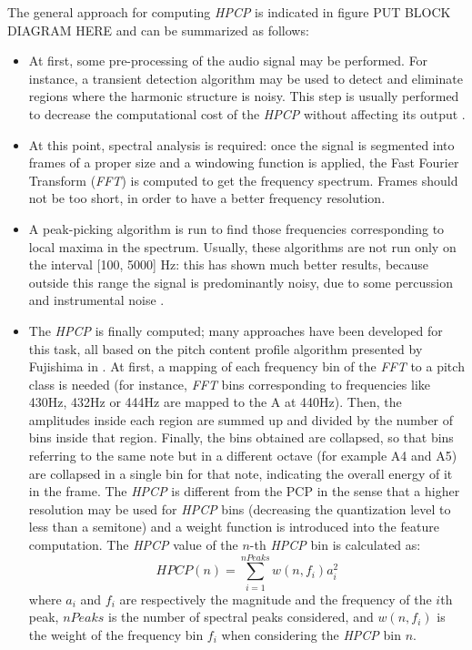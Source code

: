 The general approach for computing \textit{HPCP} is indicated in figure PUT BLOCK DIAGRAM HERE and can be summarized as follows:
\begin{itemize}
\item At first, some pre-processing of the audio signal may be performed. For instance, a transient detection algorithm may be used to detect and eliminate regions where the harmonic structure is noisy. This step is usually performed to decrease the computational cost of the \textit{HPCP} without affecting its output \cite{bonada00}.
\item At this point, spectral analysis is required: once the signal is segmented into frames of a proper size and a windowing function is applied, the Fast Fourier Transform (\textit{FFT}) is computed to get the frequency spectrum. Frames should not be too short, in order to have a better frequency resolution. 
\item A peak-picking algorithm is run to find those frequencies corresponding to local maxima in the spectrum. Usually, these algorithms are not run only on the interval [100, 5000] Hz: this has shown much better results, because outside this range the signal is predominantly noisy, due to some percussion and instrumental noise \cite{gomez06}.
\item The \textit{HPCP} is finally computed; many approaches have been developed for this task, all based on the pitch content profile algorithm presented by Fujishima in \cite{fujishima99}. At first, a mapping of each frequency bin of the \textit{FFT} to a pitch class is needed (for instance, \textit{FFT} bins corresponding to frequencies like 430Hz, 432Hz or 444Hz are mapped to the A at 440Hz). Then, the amplitudes inside each region are summed up and divided by the number of bins inside that region. Finally, the bins obtained are collapsed, so that bins referring to the same note but in a different octave (for example A4 and A5) are collapsed in a single bin for that note, indicating the overall energy of it in the frame. The \textit{HPCP} is different from the PCP in the sense that a higher resolution may be used for \textit{HPCP} bins (decreasing the quantization level to less than a semitone) and a weight function is introduced into the feature computation. The \textit{HPCP} value of the $n$-th \textit{HPCP} bin is calculated as:
\begin{equation}
HPCP(n) = \sum\limits_{i=1}^{nPeaks} w(n, f_i)a_i^2
\end{equation}
where $a_i$ and $f_i$ are respectively the magnitude and the frequency of the $i$th peak, $nPeaks$ is the number of spectral peaks considered, and $w(n, f_i)$ is the weight of the frequency bin $f_i$ when considering the \textit{HPCP} bin $n$.

\end{itemize}
